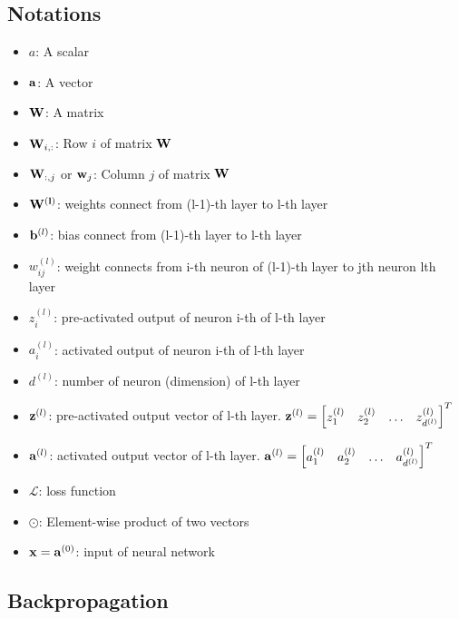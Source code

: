 \documentclass[14pt, a4paper]{article}
\numberwithin{equation}{section}
\numberwithin{algorithm}{section}
\numberwithin{figure}{section}
\begin{document}
\subsection{Notations}
\begin{itemize}
  \item $a$: A scalar
    \item $\bold{a}$: A vector
    \item $\bold{W}$: A matrix
     \item $\bold{W}_{i,:}$: Row $i$ of matrix $\bold{W}$
      \item $\bold{W}_{:,j}$ or $\bold{w}_j$: Column $j$ of matrix $\bold{W}$
       \item $\bold{W^{(l)}}$: weights connect from (l-1)-th layer to l-th layer
      \item $\bold{b}^{(l)}$: bias connect from (l-1)-th layer to l-th layer
      \item $w_{ij}^{(l)}$: weight connects from i-th neuron of (l-1)-th layer to jth neuron lth layer
      \item $z_{i}^{(l)}$: pre-activated output of neuron i-th of l-th layer
      \item $a_{i}^{(l)}$: activated output of neuron i-th of l-th layer
      \item $d^{(l)}$: number of neuron (dimension) of l-th layer
      \item $\bold{z}^{(l)}$: pre-activated output vector of l-th layer. $\bold{z}^{(l)} = \begin{bmatrix} z_1^{(l)} & z_2^{(l)} & \dots & z_{d^{(l)}}^{(l)}\end{bmatrix}^T$
      \item $\bold{a}^{(l)}$: activated output vector of l-th layer. $\bold{a}^{(l)} = \begin{bmatrix} a_1^{(l)} & a_2^{(l)} &\dots & a_{d^{(l)}}^{(l)}\end{bmatrix}^T$
      \item $\mathcal{L}$: loss function
      \item $\odot$: Element-wise product of two vectors
      \item $\bold{x}=\bold{a}^{(0)}$: input of neural network
\end{itemize}

\subsection{Backpropagation}
\end{document}
